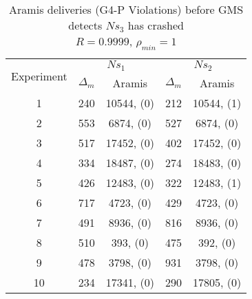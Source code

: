 \begin{table}[p]
    \begin{center}
        \renewcommand{\arraystretch}{1.25}
        \begin{tabular}{|c|c|c|c|c|}
            \hline
            \multirow{2}{*}{Experiment} & \multicolumn{2}{|c|}{$Ns_1$} & \multicolumn{2}{|c|}{$Ns_2$} \\ \cline{2-5}
                                                       & $\Delta_m$&\textsf{Aramis} & $\Delta_m$&\textsf{Aramis} \\ \hline \hline
            1 & 240 & 10544, (0) & 212 & 10544, (1) \\ \hline
            2 & 553 & 6874, (0) & 527 & 6874, (0) \\ \hline
            3 & 517 & 17452, (0) & 402 & 17452, (0) \\ \hline
            4 & 334 & 18487, (0) & 274 & 18483, (0) \\ \hline
            5 & 426 & 12483, (0) & 322 & 12483, (1) \\ \hline
            6 & 717 & 4723, (0) & 429 & 4723, (0) \\ \hline
            7 & 491 & 8936, (0) & 816 & 8936, (0) \\ \hline
            8 & 510 & 393, (0) & 475 & 392, (0) \\ \hline
            9 & 478 & 3798, (0) & 931 & 3798, (0) \\ \hline
            10 & 234 & 17341, (0) & 290 & 17805, (0) \\  \hline
        \end{tabular}
        \caption{\textsf{Aramis} deliveries (G4-P Violations) before GMS detects $Ns_3$ has crashed \\ $R=0.9999$, $\rho_{min}=1$}
        \label{table:crashed_node_rho1}
    \end{center}
\end{table}

